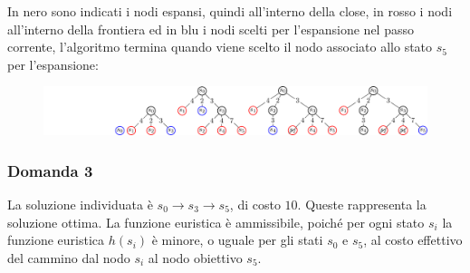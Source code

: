 \documentclass{article}
\numberwithin{equation}{section}
\begin{document}
In nero sono indicati i nodi espansi, quindi all'interno della close, in rosso i nodi all'interno della frontiera ed in blu i nodi scelti per l'espansione nel passo corrente, l'algoritmo termina quando viene scelto il nodo associato allo stato $s_5$ per l'espansione:

\begin{figure}[H]%
    \centering
    \includegraphics[trim={3.9cm 0 0 0},scale=0.9]{albero_ricerca_25-11-24.pdf}%
\end{figure}

\subsubsection*{Domanda 3}

La soluzione individuata è $s_0\rightarrow s_3\rightarrow s_5$, di costo $10$. Queste rappresenta la soluzione ottima. La funzione euristica è ammissibile, poiché per ogni stato $s_i$ la funzione euristica $h(s_i)$ è minore, o uguale per gli stati $s_0$ e $s_5$, al costo effettivo del cammino dal nodo $s_i$ al nodo obiettivo $s_5$. 

\end{document}
